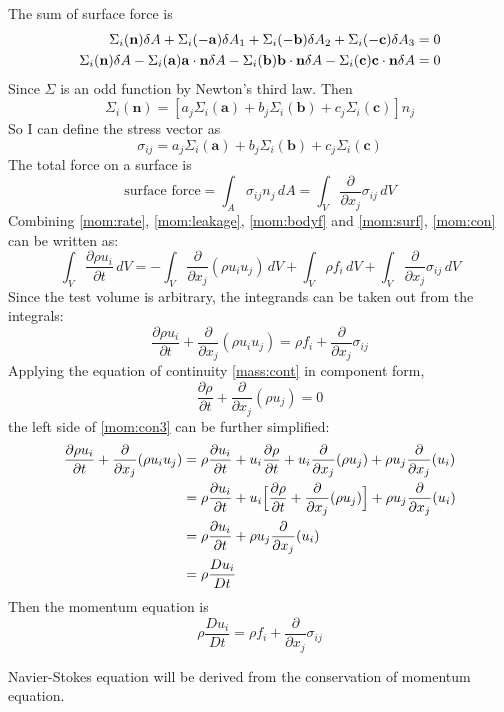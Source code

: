 The sum of surface force is
\begin{align}
    \Sigma_i(\mathbf{n})\delta A + \Sigma_i(-\mathbf{a})\delta A_1 + \Sigma_i(-\mathbf{b})\delta
    A_2 + \Sigma_i(-\mathbf{c})\delta A_3 = 0\notag\\
    \Sigma_i(\mathbf{n})\delta A - \Sigma_i(\mathbf{a})\mathbf{a}\cdot \mathbf{n}\delta A
     - \Sigma_i(\mathbf{b})\mathbf{b}\cdot \mathbf{n}\delta
    A - \Sigma_i(\mathbf{c})\mathbf{c}\cdot \mathbf{n}\delta A = 0
\end{align}
Since $\Sigma$ is an odd function by Newton's third law. Then
\begin{equation}\label{mom:surf1}
    \Sigma_i(\mathbf{n}) = [ a_j\Sigma_i(\mathbf{a}) + b_j\Sigma_i(\mathbf{b}) +
    c_j\Sigma_i(\mathbf{c})] n_j
\end{equation}
So I can define the stress vector as
\begin{equation}\label{mom:surf1}
    \sigma_{ij} = a_j\Sigma_i(\mathbf{a}) + b_j\Sigma_i(\mathbf{b}) +
    c_j\Sigma_i(\mathbf{c})
\end{equation}
The total force on a surface is
\begin{equation}\label{mom:surf}
    \text{surface force} = \int_A\sigma_{ij}n_j\,dA = \int_V\frac{\partial}{\partial x_j}\sigma_{ij}\,dV
\end{equation}
Combining \eqref{mom:rate}, \eqref{mom:leakage}, \eqref{mom:bodyf}
and \eqref{mom:surf}, \eqref{mom:con} can be written as:
\begin{equation}\label{mom:con2}
    \int_V\frac{\partial\rho u_i}{\partial t}\,dV = - \int_V\frac{\partial}{\partial x_j}(\rho u_i
    u_j)\,dV + \int_V\rho f_i\,dV + \int_V\frac{\partial}{\partial x_j}\sigma_{ij}\,dV
\end{equation}
Since the test volume is arbitrary, the integrands can be taken out
from the integrals:
\begin{equation}\label{mom:con3}
    \frac{\partial\rho u_i}{\partial t} + \frac{\partial}{\partial x_j}(\rho u_i
    u_j) = \rho f_i + \frac{\partial}{\partial x_j}\sigma_{ij}
\end{equation}
Applying the equation of continuity \eqref{mass:cont} in component
form,
\begin{equation*}
\frac{\partial\rho}{\partial t}+\frac{\partial}{\partial x_j}(\rho
u_j) = 0
\end{equation*}
the left side of \eqref{mom:con3} can be further simplified:
\begin{align*}
    \frac{\partial\rho u_i}{\partial t} + \frac{\partial}{\partial x_j}(\rho u_i
    u_j) &= \rho\frac{\partial u_i}{\partial t} + u_i\frac{\partial\rho}{\partial t} +
    u_i\frac{\partial}{\partial x_j}(\rho u_j) + \rho u_j\frac{\partial}{\partial
    x_j}(u_i)\\
    &= \rho\frac{\partial u_i}{\partial t} + u_i\Bigl[\frac{\partial\rho}{\partial t} +
    \frac{\partial}{\partial x_j}(\rho u_j)\Bigr] + \rho u_j\frac{\partial}{\partial
    x_j}(u_i)\\
    &= \rho\frac{\partial u_i}{\partial t} + \rho u_j\frac{\partial}{\partial
    x_j}(u_i)\\
    &= \rho\frac{D u_i}{D t}
\end{align*}
Then the momentum equation is
\begin{equation}\label{mom:eq}
    \boxed{\rho\frac{D u_i}{D t} = \rho f_i + \frac{\partial}{\partial
    x_j}\sigma_{ij}}
\end{equation}

Navier-Stokes equation will be derived from the conservation of
momentum equation.
